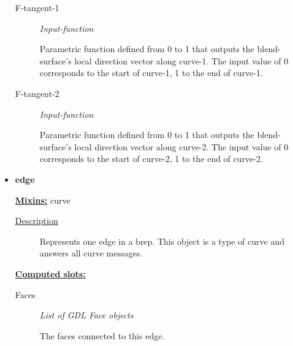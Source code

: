 \documentclass [11pt]{book}
\begin{document}
\begin{itemize}
\begin{description}
\item [F-tangent-1]
\emph{Input-function}

 Parametric function defined from 0 to 1 that outputs the blend-surface's local direction vector along curve-1. The input value of 0 corresponds to the start of curve-1, 1 to the end of curve-1.




\item [F-tangent-2]
\emph{Input-function}

 Parametric function defined from 0 to 1 that outputs the blend-surface's local direction vector along curve-2. The input value of 0 corresponds to the start of curve-2, 1 to the end of curve-2.




\end{description}







\item {}
\label{prim:edge}
\textbf{edge}


\textbf{
\underline{Mixins:}} curve





\begin{description}

\item [
\underline{Description}]


Represents one edge in a brep. This object is a type of curve and answers all curve messages.



\end{description}








\textbf{
\underline{Computed slots:}}

\begin{description}

\item [Faces]
\emph{List of GDL Face objects}

 The faces connected to this edge.




\end{description}







\end{itemize}
\end{document}
